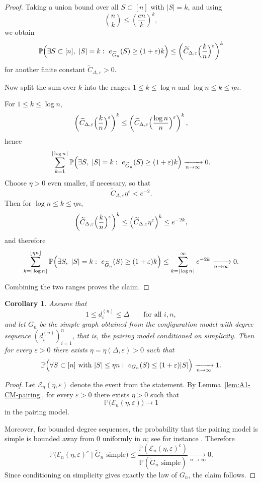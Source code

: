 \documentclass[11pt]{article}
\newtheorem{corollary}[theorem]{Corollary}
\theoremstyle{remark}
\theoremstyle{plain}
\newcommand{\Pbb}{\mathbb{P}}
\newcommand{\1}{\mathbbm{1}}
\begin{document}
\begin{proof}
Taking a union bound over all \(S\subset[n]\) with \(|S|=k\), and using
\[
\binom{n}{k}\le \left(\frac{en}{k}\right)^k,
\]
we obtain
\[
\Pbb\Bigl(
\exists S\subset[n],\ |S|=k:\ e_{\widetilde G_n}(S)\ge (1+\varepsilon)k
\Bigr)
\le
\left(
\widetilde C_{\Delta,\varepsilon}\Bigl(\frac{k}{n}\Bigr)^\varepsilon
\right)^k
\]
for another finite constant \(\widetilde C_{\Delta,\varepsilon}>0\).

Now split the sum over \(k\) into the ranges \(1\le k\le \log n\) and \(\log n\le k\le \eta n\).

For \(1\le k\le \log n\),
\[
\left(
\widetilde C_{\Delta,\varepsilon}\Bigl(\frac{k}{n}\Bigr)^\varepsilon
\right)^k
\le
\left(
\widetilde C_{\Delta,\varepsilon}\Bigl(\frac{\log n}{n}\Bigr)^\varepsilon
\right)^k,
\]
hence
\[
\sum_{k=1}^{\lfloor\log n\rfloor}
\Pbb\Bigl(
\exists S,\ |S|=k:\ e_{\widetilde G_n}(S)\ge (1+\varepsilon)k
\Bigr)\xrightarrow[n\to\infty]{}0.
\]
Choose \(\eta>0\) even smaller, if necessary, so that
\[
\widetilde C_{\Delta,\varepsilon}\eta^\varepsilon<e^{-2}.
\]
Then for \(\log n\le k\le \eta n\),
\[
\left(
\widetilde C_{\Delta,\varepsilon}\Bigl(\frac{k}{n}\Bigr)^\varepsilon
\right)^k
\le
\left(\widetilde C_{\Delta,\varepsilon}\eta^\varepsilon\right)^k
\le e^{-2k},
\]
and therefore
\[
\sum_{k=\lceil\log n\rceil}^{\lfloor\eta n\rfloor}
\Pbb\Bigl(
\exists S,\ |S|=k:\ e_{\widetilde G_n}(S)\ge (1+\varepsilon)k
\Bigr)
\le
\sum_{k=\lceil\log n\rceil}^{\infty} e^{-2k}
\xrightarrow[n\to\infty]{}0.
\]

Combining the two ranges proves the claim.
\end{proof}

\begin{corollary}
\label{cor:A1-CM}
Assume that
\[
1\le d_i^{(n)}\le \Delta
\qquad\text{for all }i,n,
\]
and let \(G_n\) be the simple graph obtained from the configuration model with degree sequence \((d_i^{(n)})_{i=1}^n\), that is, the pairing model conditioned on simplicity. Then for every \(\varepsilon>0\) there exists \(\eta=\eta(\Delta,\varepsilon)>0\) such that
\[
\Pbb\Bigl(
\forall S\subset[n]\text{ with }|S|\le \eta n:\ 
e_{G_n}(S)\le (1+\varepsilon)|S|
\Bigr)\xrightarrow[n\to\infty]{}1.
\]
\end{corollary}

\begin{proof}
Let \(\mathcal E_n(\eta,\varepsilon)\) denote the event from the statement. By Lemma~\ref{lem:A1-CM-pairing}, for every \(\varepsilon>0\) there exists \(\eta>0\) such that
\[
\Pbb\bigl(\mathcal E_n(\eta,\varepsilon)\bigr)\to 1
\]
in the pairing model.

Moreover, for bounded degree sequences, the probability that the pairing model is simple is bounded away from \(0\) uniformly in \(n\); see for instance \cite[Theorem 1.1]{Janson2009}. Therefore
\[
\Pbb\bigl(\mathcal E_n(\eta,\varepsilon)^c \mid \widetilde G_n \text{ simple}\bigr)
\le
\frac{\Pbb(\mathcal E_n(\eta,\varepsilon)^c)}{\Pbb(\widetilde G_n \text{ simple})}
\xrightarrow[n\to\infty]{}0.
\]
Since conditioning on simplicity gives exactly the law of \(G_n\), the claim follows.
\end{proof}
\end{document}
